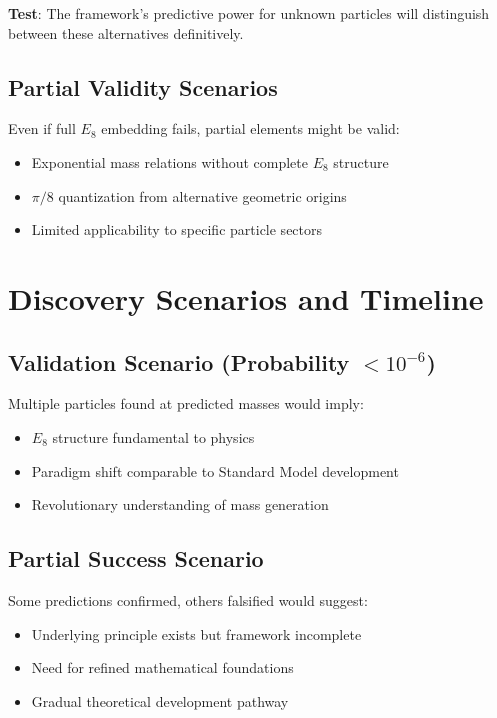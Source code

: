 \documentclass[12pt,a4paper]{article}
\begin{document}
\textbf{Test}: The framework's predictive power for unknown particles will distinguish between these alternatives definitively.

\subsection{Partial Validity Scenarios}

Even if full $E_{8}$ embedding fails, partial elements might be valid:
\begin{itemize}
\item Exponential mass relations without complete $E_{8}$ structure
\item $\pi/8$ quantization from alternative geometric origins
\item Limited applicability to specific particle sectors
\end{itemize}

\section{Discovery Scenarios and Timeline}

\subsection{Validation Scenario (Probability $< 10^{-6}$)}

Multiple particles found at predicted masses would imply:
\begin{itemize}
\item $E_{8}$ structure fundamental to physics
\item Paradigm shift comparable to Standard Model development
\item Revolutionary understanding of mass generation
\end{itemize}

\subsection{Partial Success Scenario}

Some predictions confirmed, others falsified would suggest:
\begin{itemize}
\item Underlying principle exists but framework incomplete
\item Need for refined mathematical foundations
\item Gradual theoretical development pathway
\end{itemize}
\end{document}
